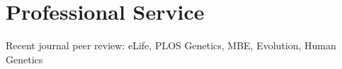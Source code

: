 \documentclass[letterpaper]{article}
\renewenvironment{itemize}{
  \begin{list}{}{
    \setlength{\leftmargin}{1.5em}
  }
}{
  \end{list}
}
\begin{document}
\section*{Professional Service}
\begin{itemize}

\item Recent journal peer review: eLife, PLOS Genetics, MBE, Evolution, Human Genetics

\end{itemize}

\end{document}
